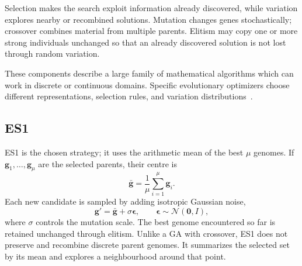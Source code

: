 Selection makes the search exploit information already discovered, while variation explores nearby or recombined solutions. Mutation changes genes stochastically; crossover combines material from multiple parents. Elitism may copy one or more strong individuals unchanged so that an already discovered solution is not lost through random variation.

These components describe a large family of mathematical algorithms which can work in discrete or continuous domains. Specific evolutionary optimizers choose different representations, selection rules, and variation distributions~\cite{eiben2015evolutionary}.

\subsection{ES1}

ES1 is the chosen strategy; it uses the arithmetic mean of the best $\mu$ genomes. If $\mathbf{g}_1,\ldots,\mathbf{g}_\mu$ are the selected parents, their centre is
\begin{equation}
  \bar{\mathbf{g}}=\frac{1}{\mu}\sum_{i=1}^{\mu}\mathbf{g}_i.
\end{equation}
Each new candidate is sampled by adding isotropic Gaussian noise,
\begin{equation}
  \mathbf{g}'=\bar{\mathbf{g}}+\sigma\boldsymbol{\epsilon},
  \qquad \boldsymbol{\epsilon}\sim\mathcal{N}(\mathbf{0},I),
  \label{eq:es1}
\end{equation}
where $\sigma$ controls the mutation scale. The best genome encountered so far is retained unchanged through elitism. Unlike a GA with crossover, ES1 does not preserve and recombine discrete parent genomes. It summarizes the selected set by its mean and explores a neighbourhood around that point.
